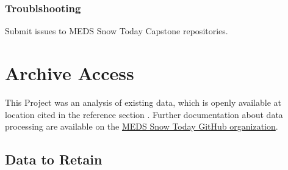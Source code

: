 \documentclass[
]{book}
\begin{document}
\hypertarget{troublshooting}{%
\subsection{Troublshooting}\label{troublshooting}}

Submit issues to MEDS Snow Today Capstone repositories.

\hypertarget{archive}{%
\chapter{Archive Access}\label{archive}}

This Project was an analysis of existing data, which is openly available at location cited in the reference section \citep{stillinger2022}. Further documentation about data processing are available on the \href{https://github.com/MEDSsnowtoday}{MEDS Snow Today GitHub organization}.

\hypertarget{data-to-retain}{%
\section{Data to Retain}\label{data-to-retain}}

  
\end{document}
